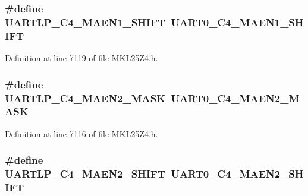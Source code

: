 \subsubsection[{\texorpdfstring{U\+A\+R\+T\+L\+P\+\_\+\+C4\+\_\+\+M\+A\+E\+N1\+\_\+\+S\+H\+I\+FT}{UARTLP_C4_MAEN1_SHIFT}}]{\setlength{\rightskip}{0pt plus 5cm}\#define U\+A\+R\+T\+L\+P\+\_\+\+C4\+\_\+\+M\+A\+E\+N1\+\_\+\+S\+H\+I\+FT~{\bf U\+A\+R\+T0\+\_\+\+C4\+\_\+\+M\+A\+E\+N1\+\_\+\+S\+H\+I\+FT}}\hypertarget{group___backward___compatibility___symbols_ga0c83ed1dac8e50a43d52747f42b80a3d}{}\label{group___backward___compatibility___symbols_ga0c83ed1dac8e50a43d52747f42b80a3d}


Definition at line 7119 of file M\+K\+L25\+Z4.\+h.

\subsubsection[{\texorpdfstring{U\+A\+R\+T\+L\+P\+\_\+\+C4\+\_\+\+M\+A\+E\+N2\+\_\+\+M\+A\+SK}{UARTLP_C4_MAEN2_MASK}}]{\setlength{\rightskip}{0pt plus 5cm}\#define U\+A\+R\+T\+L\+P\+\_\+\+C4\+\_\+\+M\+A\+E\+N2\+\_\+\+M\+A\+SK~{\bf U\+A\+R\+T0\+\_\+\+C4\+\_\+\+M\+A\+E\+N2\+\_\+\+M\+A\+SK}}\hypertarget{group___backward___compatibility___symbols_ga90e33c5bb1be6d39e1d0f937253daf0b}{}\label{group___backward___compatibility___symbols_ga90e33c5bb1be6d39e1d0f937253daf0b}


Definition at line 7116 of file M\+K\+L25\+Z4.\+h.

\subsubsection[{\texorpdfstring{U\+A\+R\+T\+L\+P\+\_\+\+C4\+\_\+\+M\+A\+E\+N2\+\_\+\+S\+H\+I\+FT}{UARTLP_C4_MAEN2_SHIFT}}]{\setlength{\rightskip}{0pt plus 5cm}\#define U\+A\+R\+T\+L\+P\+\_\+\+C4\+\_\+\+M\+A\+E\+N2\+\_\+\+S\+H\+I\+FT~{\bf U\+A\+R\+T0\+\_\+\+C4\+\_\+\+M\+A\+E\+N2\+\_\+\+S\+H\+I\+FT}}\hypertarget{group___backward___compatibility___symbols_ga9b129e14e5aac5ef9707937d91fd0046}{}\label{group___backward___compatibility___symbols_ga9b129e14e5aac5ef9707937d91fd0046}


